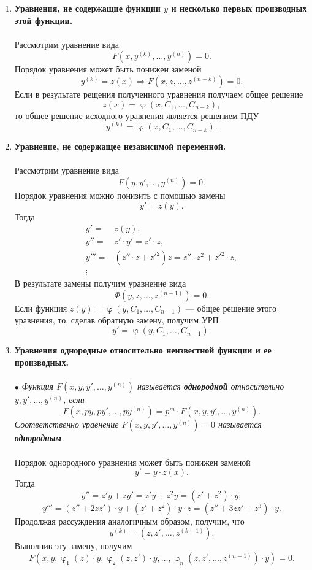 \documentclass[a4paper, 12pt]{report}
\newcommand{\FI}{\Phi}
\renewcommand{\varphi}{\upvarphi}
\begin{document}
	\begin{enumerate}
		\item \textbf{Уравнения, не содержащие функции $y$ и несколько первых производных этой функции.}\\\\
		Рассмотрим уравнение вида $$F(x,y^{(k)}, \ldots, y^{(n)}) = 0.$$
		Порядок уравнения может быть понижен заменой $$y^{(k)} = z(x) \Rightarrow F(x, z, \ldots, z^{(n-k)}) = 0.$$
		Если в результате рещения полученного уравнения получаем общее решение $$z(x) = \varphi(x, C_1, \ldots, C_{n-k}),$$
		то общее решение исходного уравнения является решением ПДУ $$y^{(k)} = \varphi(x, C_1, \ldots, C_{n-k}).$$
		\item \textbf{Уравнение, не содержащее независимой переменной.}\\\\Рассмотрим уравнение вида $$F(y,y',\ldots, y^{(n)}) = 0.$$
		Порядок уравнения можно понизить с помощью замены $$y' = z(y).$$
		Тогда  $$\begin{aligned}
			y' =& z(y),\\
			y'' =& z'\cdot y' = z'\cdot z,\\
			y''' =& (z''\cdot z + z'^2)z = z''\cdot z^2 + z'^2 \cdot z,\\
			\vdots
		\end{aligned}$$
		В результате замены получим уравнение вида $$\FI(y,z,\ldots, z^{(n-1)}) = 0.$$
		Если функция $z(y) = \varphi(y, C_1,\ldots, C_{n-1})$ --- общее решение этого уравнения, то, сделав обратную замену, получим УРП $$y' =  \varphi(y, C_1,\ldots, C_{n-1}).$$
		\item \textbf{Уравнения однородные относительно неизвестной функции и ее производных.}\\\\
		$\bullet$ \textit{Функция $F(x,y,y',\ldots, y^{(n)})$ называется \textbf{однородной} относительно $y,y',\ldots, y^{(n)}$, если $$F(x,py,py',\ldots, py^{(n)}) = p^m\cdot F(x,y,y',\ldots, y^{(n)}).$$ Соответственно уравнение $F(x,y,y',\ldots, y^{(n)}) = 0$ называется \textbf{однородным}.}\\\\
		Порядок однородного уравнения может быть понижен заменой $$y' = y\cdot z(x).$$
		Тогда $$y'' = z'y + zy' = z'y + z^2 y = (z' + z^2)\cdot y;$$
		$$y''' = (z'' + 2zz')\cdot y + (z' + z^2)\cdot y \cdot z = (z'' + 3zz' + z^3)\cdot y.$$
		Продолжая рассуждения аналогичным образом, получим, что $$y^{(k)} = (z,z',\ldots, z^{(k-1)}).$$
		Выполнив эту замену, получим $$F(x,y,\varphi_1(z)\cdot y, \varphi_2(z,z')\cdot y,\ldots, \varphi_n(z,z',\ldots, z^{(n-1)})\cdot y) = 0.$$

\end{enumerate}
\end{document}
